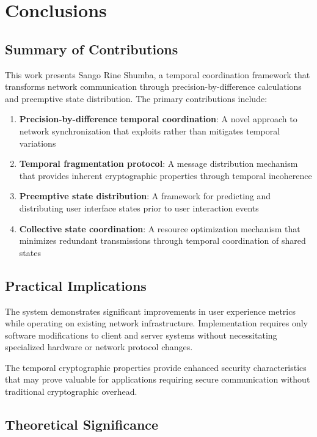 \documentclass[12pt,a4paper]{article}
\begin{document}
\section{Conclusions}

\subsection{Summary of Contributions}

This work presents Sango Rine Shumba, a temporal coordination framework that transforms network communication through precision-by-difference calculations and preemptive state distribution. The primary contributions include:

\begin{enumerate}
\item \textbf{Precision-by-difference temporal coordination}: A novel approach to network synchronization that exploits rather than mitigates temporal variations
\item \textbf{Temporal fragmentation protocol}: A message distribution mechanism that provides inherent cryptographic properties through temporal incoherence
\item \textbf{Preemptive state distribution}: A framework for predicting and distributing user interface states prior to user interaction events
\item \textbf{Collective state coordination}: A resource optimization mechanism that minimizes redundant transmissions through temporal coordination of shared states
\end{enumerate}

\subsection{Practical Implications}

The system demonstrates significant improvements in user experience metrics while operating on existing network infrastructure. Implementation requires only software modifications to client and server systems without necessitating specialized hardware or network protocol changes.

The temporal cryptographic properties provide enhanced security characteristics that may prove valuable for applications requiring secure communication without traditional cryptographic overhead.

\subsection{Theoretical Significance}
\end{document}
